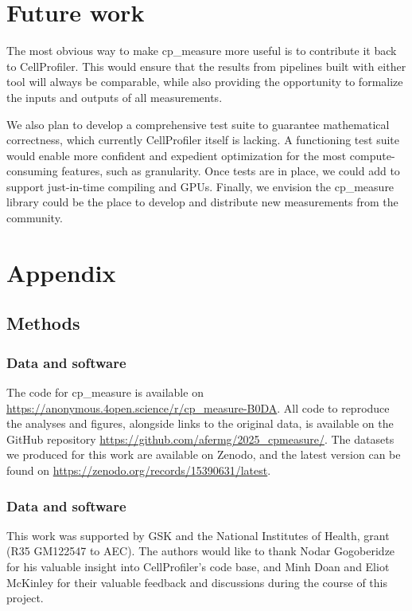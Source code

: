 \documentclass{article}
\begin{document}
\section{Future work}
\label{sec:org5cdbb12}
The most obvious way to make cp\_measure more useful is to contribute it back to CellProfiler. This would ensure that the results from pipelines built with either tool will always be comparable, while also providing the opportunity to formalize the inputs and outputs of all measurements. 

We also plan to develop a comprehensive test suite to guarantee mathematical correctness, which currently CellProfiler itself is lacking. A functioning test suite would enable more confident and expedient optimization for the most compute-consuming features, such as granularity. Once tests are in place, we could add to support just-in-time compiling and GPUs. Finally, we envision the cp\_measure library could be the place to develop and distribute new measurements from the community. 



\section{Appendix}
\label{sec:orgdd18dd8}
\subsection{Methods}
\label{sec:orgb3e9382}
\subsubsection{Data and software}
\label{sec:orgbda0ae2}
The code for cp\_measure is available on \url{https://anonymous.4open.science/r/cp\_measure-B0DA}. All code to reproduce the analyses and figures, alongside links to the original data, is available on the GitHub repository \url{https://github.com/afermg/2025\_cpmeasure/}. The datasets we produced for this work are available on Zenodo, and the latest version can be found on \url{https://zenodo.org/records/15390631/latest}.
\subsubsection{Data and software}
\label{sec:acknowledgements}

This work was supported by GSK and the National Institutes of Health, grant (R35 GM122547 to AEC). The authors would like to thank Nodar Gogoberidze for his valuable insight into CellProfiler's code base, and Minh Doan and Eliot McKinley for their valuable feedback and discussions during the course of this project.
\end{document}
